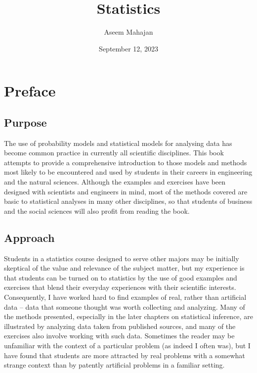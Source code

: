 \documentclass[]{book}
\title{Statistics}
\author{Aseem Mahajan}
\date{September 12, 2023}
\begin{document}
\chapter*{Preface}
\section*{Purpose}
The use of probability models and statistical models for analysing data has become common practice in currently all scientific disciplines. This book attempts to provide a comprehensive introduction to those models and methods most likely to be encountered and used by students in their careers in engineering and the natural sciences. Although the examples and exercises have been designed with scientists and engineers in mind, most of the methods covered are basic to statistical analyses in many other disciplines, so that students of business and the social sciences will also profit from reading the book.

\section*{Approach}
Students in a statistics course designed to serve other majors may be initially skeptical of the value and relevance of the subject matter, but my experience is that students can be turned on to statistics by the use of good examples and exercises that blend their everyday experiences with their scientific interests. Consequently, I have worked hard to find examples of real, rather than artificial data -- data that someone thought was worth collecting and analyzing. Many of the methods presented, especially in the later chapters on statistical inference, are illustrated by analyzing data taken from published sources, and many of the exercises also involve working with such data. Sometimes the reader may be unfamiliar with the context of a particular problem (as indeed I often was), but I have found that students are more attracted by real problems with a somewhat strange context than by patently artificial problems in a familiar setting.
\end{document}
